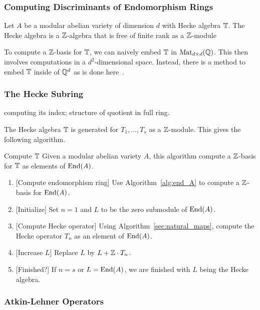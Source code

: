 \documentclass{article}
\begin{document}
\subsubsection{Computing Discriminants of Endomorphism Rings}

Let $A$ be a modular abelian variety of dimension $d$ with Hecke algebra $\mathbb{T}$.
The Hecke algebra is a $\mathbb{Z}$-algebra that is free of finite rank as a
$\mathbb{Z}$-module

To compute a $\mathbb{Z}$-basis for $\mathbb{T}$, we can naively embed $\mathbb{T}$ in $\operatorname{Mat}_{d\times
d}(\mathbb{Q})$. This then involves computations in a $d^2$-dimensional space.
Instead, there is a method to embed $\mathbb{T}$ inside of $\mathbb{Q}^d$ as is done
here~\cite{calegari-stein:disc}.

\subsubsection{The Hecke Subring}
computing its index; structure of quotient in full ring.

The Hecke algebra $\mathbb{T}$ is generated for $T_1,\ldots,T_s$ as a
$\mathbb{Z}$-module. This gives the following algorithm.
\begin{algorithm}{Compute $\mathbb{T}$}
    Given a modular abelian variety $A$, this algorithm compute a $\mathbb{Z}$-basis
    for $\mathbb{T}$ as elements of $\operatorname{End}(A)$.
    \begin{enumerate}
        \item{} [Compute endomorphism ring]
            Use Algorithm~\ref{alg:end_A} to compute a $\mathbb{Z}$-basis for
            $\operatorname{End}(A)$.
        \item{} [Initialize]
            Set $n=1$ and $L$ to be the zero submodule of $\operatorname{End}(A)$.
        \item{} [Compute Hecke operator]
            Using Algorithm~\ref{sec:natural_maps}, compute the Hecke operator
            $T_n$ as an element of $\operatorname{End}(A)$.
        \item{} [Increase $L$]
            Replace $L$ by $L+\mathbb{Z}\cdot T_n$.
        \item{} [Finished?]
            If $n=s$ or $L=\operatorname{End}(A)$, we are finished with $L$ being the Hecke
            algebra.
    \end{enumerate}
\end{algorithm} 

\subsubsection{Atkin-Lehner Operators}
\end{document}
